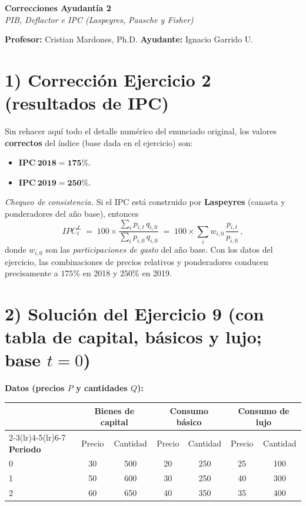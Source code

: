 \documentclass[11pt,addpoints]{article}
\begin{document}
\vspace*{0.05cm}
\begin{center}
{\Large \bfseries Correcciones Ayudantía 2}\\[2mm]
{\normalsize \textit{PIB, Deflactor e IPC (Laspeyres, Paasche y Fisher)}}
\end{center}
\textbf{Profesor:} Cristian Mardones, Ph.D. \quad \textbf{Ayudante:} Ignacio Garrido U.
\bigskip

\section*{1) Corrección Ejercicio 2 (resultados de IPC)}
Sin rehacer aquí todo el detalle numérico del enunciado original, los valores \textbf{correctos} del índice (base dada en el ejercicio) son:
\begin{itemize}
  \item \(\mathbf{IPC\ 2018 = 175\%}\).
  \item \(\mathbf{IPC\ 2019 = 250\%}\).
\end{itemize}
\textit{Chequeo de consistencia.} Si el IPC está construido por \textbf{Laspeyres} (canasta y ponderadores del año base), entonces
\begin{equation*}
  IPC_t^{L} \;=\; 100 \times \frac{\sum_i p_{i,t}\,q_{i,0}}{\sum_i p_{i,0}\,q_{i,0}} \;=\; 100 \times \sum_i w_{i,0}\,\frac{p_{i,t}}{p_{i,0}}\,,
\end{equation*}
donde \(w_{i,0}\) son las \emph{participaciones de gasto} del año base. Con los datos del ejercicio, las combinaciones de precios relativos y ponderadores conducen precisamente a \(175\%\) en 2018 y \(250\%\) en 2019.

\bigskip
\section*{2) Solución del Ejercicio 9 (con tabla de capital, básicos y lujo; base \(t=0\))}
\textbf{Datos (precios \(P\) y cantidades \(Q\)):}
\begin{center}
\setlength{\tabcolsep}{6pt}
\begin{tabular}{lcccccc}
\toprule
 & \multicolumn{2}{c}{\textbf{Bienes de capital}} & \multicolumn{2}{c}{\textbf{Consumo básico}} & \multicolumn{2}{c}{\textbf{Consumo de lujo}}\\
\cmidrule(lr){2-3}\cmidrule(lr){4-5}\cmidrule(lr){6-7}
\textbf{Periodo} & Precio & Cantidad & Precio & Cantidad & Precio & Cantidad\\
\midrule
0 & 30 & 500 & 20 & 250 & 25 & 100\\
1 & 50 & 600 & 30 & 250 & 40 & 300\\
2 & 60 & 650 & 40 & 350 & 35 & 400\\
\bottomrule
\end{tabular}
\end{center}
\end{document}
